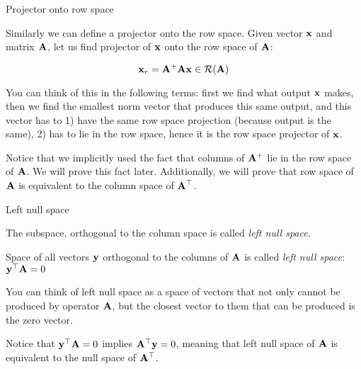 \documentclass{beamer}
\begin{document}
\begin{frame}{Projector onto row space}
	\begin{flushleft}
		
		Similarly we can define a projector onto the row space. Given vector $\mathbf{x}$ and matrix $\mathbf{A}$, let us find projector of $\mathbf{x}$ onto the row space of $\mathbf{A}$:
		
		\begin{equation}
			\mathbf{x}_r = \mathbf{A}^+\mathbf{A} \mathbf{x} \in \mathcal{R}(\mathbf{A})
		\end{equation}
		
		You can think of this in the following terms: first we find what output $\mathbf{x}$ makes, then we find the smallest norm vector that produces this same output, and this vector has to 1) have the same row space projection (because output is the same), 2) has to lie in the row space, hence it is the row space projector of $\mathbf{x}$.
		
		\bigskip
		
		Notice that we implicitly used the fact that columns of $\mathbf{A}^+$ lie in the row space of $\mathbf{A}$. We will prove this fact later. Additionally, we will prove that row space of $\mathbf{A}$ is equivalent to the column space of $\mathbf{A}^\top$.
		
	\end{flushleft}
\end{frame}




\begin{frame}{Left null space}
	\begin{flushleft}
		
		The subspace, orthogonal to the column space is called \emph{left null space}.
		
		\bigskip
		
		\begin{definition}
			Space of all vectors $\mathbf{y}$ orthogonal to the columns of $\mathbf{A}$ is called \emph{left null space}: $\mathbf{y}^\top\mathbf{A} = 0$
		\end{definition}
		
		You can think of left null space as a space of vectors that not only cannot be produced by operator $\mathbf{A}$, but the closest vector to them that can be produced is the zero vector.
		
		\bigskip
		
		Notice that $\mathbf{y}^\top \mathbf{A} = 0$ implies $\mathbf{A}^\top \mathbf{y} = 0$, meaning that left null space of $\mathbf{A}$ is equivalent to the null space of $\mathbf{A}^\top$.
		
		
	\end{flushleft}
\end{frame}
\end{document}
